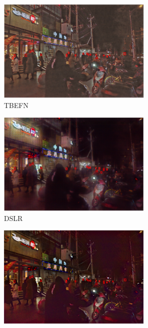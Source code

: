 \documentclass[letterpaper,12pt]{article}
\begin{document}
\begin{figure}[htbp]
\begin{subfigure}{0.22\textwidth}
			\includegraphics[width=\linewidth]{DARK_FACE/TBEFN}
			\captionsetup{font=scriptsize}
			\caption{TBEFN}
			\label{fig: DARK_FACE_f}  
		\end{subfigure}
		\begin{subfigure}{0.22\textwidth}
			\includegraphics[width=\linewidth]{DARK_FACE/DSLR}
			\captionsetup{font=scriptsize}
			\caption{DSLR}
			\label{fig: DARK_FACE_g}  
		\end{subfigure}
		\begin{subfigure}{0.22\textwidth}
			\includegraphics[width=\linewidth]{DARK_FACE/EnlightenGAN}

\end{subfigure}
\end{figure}
\end{document}
